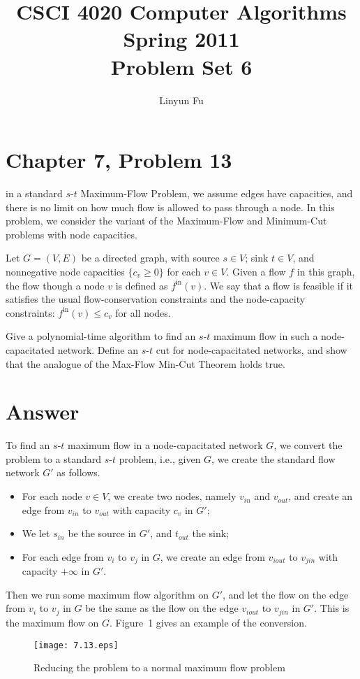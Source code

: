 \documentclass[12pt,letterpaper]{article}
\author{Linyun Fu}
\title{CSCI 4020 Computer Algorithms Spring 2011\\
Problem Set 6}
\begin{document}
\maketitle
\section*{Chapter 7, Problem 13}
in a standard $s$-$t$ Maximum-Flow Problem, we assume edges have capacities,
and there is no limit on how much flow is allowed to pass through a node. In this problem, we consider the variant of the Maximum-Flow and
Minimum-Cut problems with node capacities.

Let $G = (V, E)$ be a directed graph, with source $s \in V$; sink $t \in V$, and
nonnegative node capacities $\{c_v \ge 0\}$ for each $v \in V$. Given a flow $f$ in this
graph, the flow though a node $v$ is defined as $f^{\textrm{in}}(v)$. We say that a flow
is feasible if it satisfies the usual flow-conservation constraints and the
node-capacity constraints: $f^{\textrm{in}}(v)\le c_v$ for all nodes.

Give a polynomial-time algorithm to find an $s$-$t$ maximum flow in
such a node-capacitated network. Define an $s$-$t$ cut for node-capacitated
networks, and show that the analogue of the Max-Flow Min-Cut Theorem
holds true.

\section*{Answer}
To find an $s$-$t$ maximum flow in a node-capacitated network $G$, we convert the problem to a standard $s$-$t$ problem, i.e., given $G$, we create the standard flow network $G'$ as follows.
\begin{itemize}
\item For each node $v\in V$, we create two nodes, namely $v_{in}$ and $v_{out}$, and create an edge from $v_{in}$ to $v_{out}$ with capacity $c_v$ in $G'$;
\item We let $s_{in}$ be the source in $G'$, and $t_{out}$ the sink;
\item For each edge from $v_i$ to $v_j$ in $G$, we create an edge from $v_{iout}$ to $v_{jin}$ with capacity $+\infty$ in $G'$.
\end{itemize}
Then we run some maximum flow algorithm on $G'$, and let the flow on the edge from $v_i$ to $v_j$ in $G$ be the same as the flow on the edge $v_{iout}$ to $v_{jin}$ in $G'$. This is the maximum flow on $G$. Figure~1 gives an example of the conversion.
\begin{figure}
\begin{center}
\texttt{[image: 7.13.eps]}
\caption{Reducing the problem to a normal maximum flow problem}
\end{center}
\end{figure}
\end{document}
